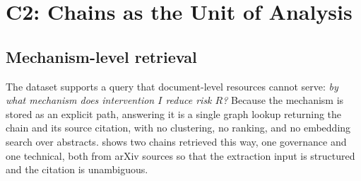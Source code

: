 \documentclass[10pt,twocolumn,letterpaper]{article}
\begin{document}
\section{C2: Chains as the Unit of Analysis}
\label{sec:claim2}

\subsection{Mechanism-level retrieval}

The dataset supports a query that document-level resources cannot serve:
\emph{by what mechanism does intervention $I$ reduce risk $R$?} Because the
mechanism is stored as an explicit path, answering it is a single graph lookup
returning the chain and its source citation, with no clustering, no ranking, and
no embedding search over abstracts.  shows two chains retrieved
this way, one governance and one technical, both from arXiv sources so that the
extraction input is structured and the citation is unambiguous.
\end{document}
